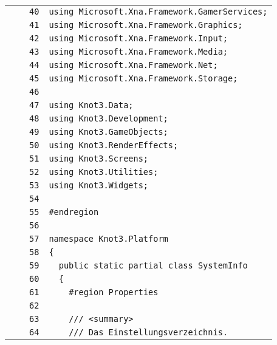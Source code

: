 \documentclass[a4paper,10pt]{article}
\begin{document}
\begin{longtable}[l]{lrrl}
\cellcolor{gray} &  & \verb~40~ & \verb~using Microsoft.Xna.Framework.GamerServices;~\\
\cellcolor{gray} &  & \verb~41~ & \verb~using Microsoft.Xna.Framework.Graphics;~\\
\cellcolor{gray} &  & \verb~42~ & \verb~using Microsoft.Xna.Framework.Input;~\\
\cellcolor{gray} &  & \verb~43~ & \verb~using Microsoft.Xna.Framework.Media;~\\
\cellcolor{gray} &  & \verb~44~ & \verb~using Microsoft.Xna.Framework.Net;~\\
\cellcolor{gray} &  & \verb~45~ & \verb~using Microsoft.Xna.Framework.Storage;~\\
\cellcolor{gray} &  & \verb~46~ & \verb~~\\
\cellcolor{gray} &  & \verb~47~ & \verb~using Knot3.Data;~\\
\cellcolor{gray} &  & \verb~48~ & \verb~using Knot3.Development;~\\
\cellcolor{gray} &  & \verb~49~ & \verb~using Knot3.GameObjects;~\\
\cellcolor{gray} &  & \verb~50~ & \verb~using Knot3.RenderEffects;~\\
\cellcolor{gray} &  & \verb~51~ & \verb~using Knot3.Screens;~\\
\cellcolor{gray} &  & \verb~52~ & \verb~using Knot3.Utilities;~\\
\cellcolor{gray} &  & \verb~53~ & \verb~using Knot3.Widgets;~\\
\cellcolor{gray} &  & \verb~54~ & \verb~~\\
\cellcolor{gray} &  & \verb~55~ & \verb~#endregion~\\
\cellcolor{gray} &  & \verb~56~ & \verb~~\\
\cellcolor{gray} &  & \verb~57~ & \verb~namespace Knot3.Platform~\\
\cellcolor{gray} &  & \verb~58~ & \verb~{~\\
\cellcolor{gray} &  & \verb~59~ & \verb~  public static partial class SystemInfo~\\
\cellcolor{gray} &  & \verb~60~ & \verb~  {~\\
\cellcolor{gray} &  & \verb~61~ & \verb~    #region Properties~\\
\cellcolor{gray} &  & \verb~62~ & \verb~~\\
\cellcolor{gray} &  & \verb~63~ & \verb~    /// <summary>~\\
\cellcolor{gray} &  & \verb~64~ & \verb~    /// Das Einstellungsverzeichnis.~\\

\end{longtable}
\end{document}
